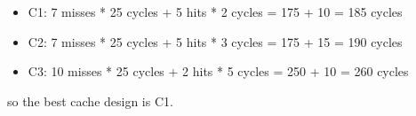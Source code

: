 \documentclass[cn,12pt]{homework}
\begin{document}
\begin{solution}
\begin{itemize}
  \item C1: 7 misses * 25 cycles + 5 hits * 2 cycles = 175 + 10 = 185 cycles
  \item C2: 7 misses * 25 cycles + 5 hits * 3 cycles = 175 + 15 = 190 cycles
  \item C3: 10 misses * 25 cycles + 2 hits * 5 cycles = 250 + 10 = 260 cycles
\end{itemize}
  so the best cache design is C1.





\end{solution}
\end{document}
